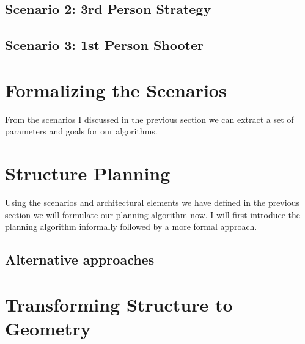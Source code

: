 \subsection{Scenario 2: 3rd Person Strategy}



\subsection{Scenario 3: 1st Person Shooter}

	
\section{Formalizing the Scenarios}

From the scenarios I discussed in the previous section we can extract a set of parameters and goals for our algorithms.
 
\section{Structure Planning}
\label{sec:PlanningAlgorithm} 
  
 Using the scenarios and architectural elements we have defined in the previous section we will formulate our planning algorithm now.
 I will first introduce the planning algorithm informally followed by a more formal approach.
      
 
 	 
 


 \subsection{Alternative approaches}
 
 
 \section{Transforming Structure to Geometry}
 